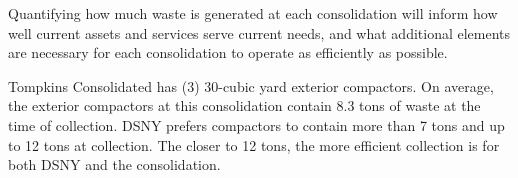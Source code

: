 
    Quantifying how much waste is generated at each consolidation will inform how well current assets and services serve current needs, and what additional elements are necessary for each consolidation to operate as efficiently as possible.
    
    Tompkins Consolidated has (3) 30-cubic yard exterior compactors. On average, the exterior compactors at this consolidation contain 8.3 tons of waste at the time of collection. DSNY prefers compactors to contain more than 7 tons and up to 12 tons at collection. The closer to 12 tons, the more efficient collection is for both DSNY and the consolidation.